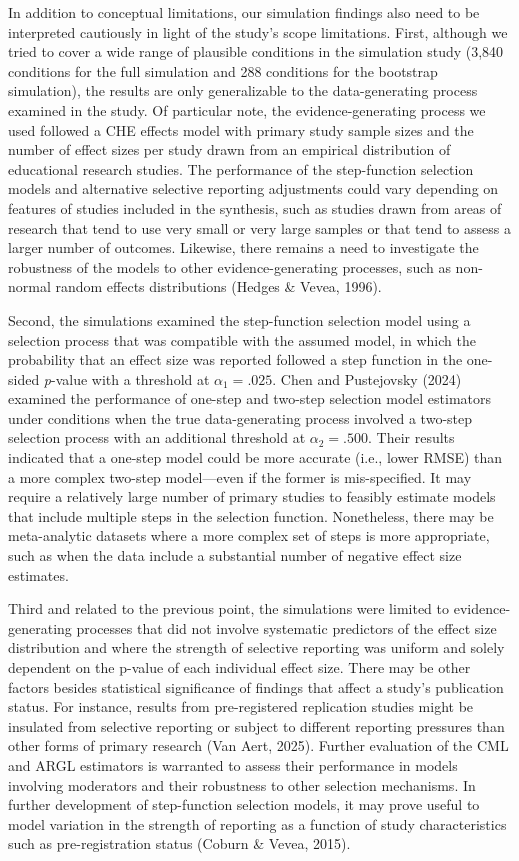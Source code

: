 \documentclass[
  man, donotrepeattitle,floatsintext]{apa7}
\begin{document}
In addition to conceptual limitations, our simulation findings also need to be interpreted cautiously in light of the study's scope limitations.
First, although we tried to cover a wide range of plausible conditions in the simulation study (3,840 conditions for the full simulation and 288 conditions for the bootstrap simulation), the results are only generalizable to the data-generating process examined in the study.
Of particular note, the evidence-generating process we used followed a CHE effects model with primary study sample sizes and the number of effect sizes per study drawn from an empirical distribution of educational research studies.
The performance of the step-function selection models and alternative selective reporting adjustments could vary depending on features of studies included in the synthesis, such as studies drawn from areas of research that tend to use very small or very large samples or that tend to assess a larger number of outcomes.
Likewise, there remains a need to investigate the robustness of the models to other evidence-generating processes, such as non-normal random effects distributions (Hedges \& Vevea, 1996).

Second, the simulations examined the step-function selection model using a selection process that was compatible with the assumed model, in which the probability that an effect size was reported followed a step function in the one-sided \emph{p}-value with a threshold at \(\alpha_1 = .025\).
Chen and Pustejovsky (2024) examined the performance of one-step and two-step selection model estimators under conditions when the true data-generating process involved a two-step selection process with an additional threshold at \(\alpha_2 = .500\).
Their results indicated that a one-step model could be more accurate (i.e., lower RMSE) than a more complex two-step model---even if the former is mis-specified.
It may require a relatively large number of primary studies to feasibly estimate models that include multiple steps in the selection function.
Nonetheless, there may be meta-analytic datasets where a more complex set of steps is more appropriate, such as when the data include a substantial number of negative effect size estimates.

Third and related to the previous point, the simulations were limited to evidence-generating processes that did not involve systematic predictors of the effect size distribution and where the strength of selective reporting was uniform and solely dependent on the p-value of each individual effect size.
There may be other factors besides statistical significance of findings that affect a study's publication status.
For instance, results from pre-registered replication studies might be insulated from selective reporting or subject to different reporting pressures than other forms of primary research (Van Aert, 2025).
Further evaluation of the CML and ARGL estimators is warranted to assess their performance in models involving moderators and their robustness to other selection mechanisms.
In further development of step-function selection models, it may prove useful to model variation in the strength of reporting as a function of study characteristics such as pre-registration status (Coburn \& Vevea, 2015).
\end{document}
